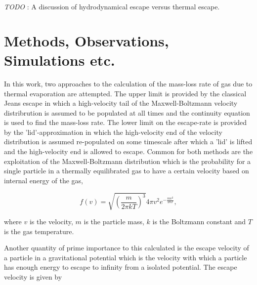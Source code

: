 \documentclass[a4paper,fleqn,usenatbib]{mnras}
\newcommand{\todo}[3]{{\color{#2}\emph{#1}: #3}}
\newcommand{\jtodo}[1]{\todo{TODO }{red}{#1}}
\begin{document}
\jtodo{A discussion of hydrodynamical escape versus thermal escape.}

%

\section{Methods, Observations, Simulations etc.}
\label{sec:Methods} %
In this work, two approaches to the calculation of the mass-loss rate of gas due to thermal evaporation are attempted. The upper limit is provided by the classical Jeans escape \citep{Jeans1925} in which a high-velocity tail of the Maxwell-Boltzmann velocity distribrution is assumed to be populated at all times and the continuity equation is used to find the mass-loss rate. The lower limit on the escape-rate is provided by the 'lid'-approximation \citep{Gross1974} in which the high-velocity end of the velocity distribution is assumed re-populated on some timescale after which a 'lid' is lifted and the high-velocity end is allowed to escape. 
Common for both methods are the exploitation of the Maxwell-Boltzmann distribution which is the probability for a single particle in a thermally equilibrated gas to have a certain velocity based on internal energy of the gas, 

\begin{equation}
f(v)=\sqrt{ \left( \frac{m}{2 \pi k T}  \right)^3 } 4 \pi v^2 e^{-\frac{mv^2}{2 k T}},
\label{eq:Boltzmann}
\end{equation}

where $v$ is the velocity, $m$ is the particle mass, $k$ is the Boltzmann constant and $T$ is the gas temperature.

Another quantity of prime importance to this calculated is the escape velocity of a particle in a gravitational potential which is the velocity with which a particle has enough energy to escape to infinity from a isolated potential. The escape velocity is given by 
\end{document}
